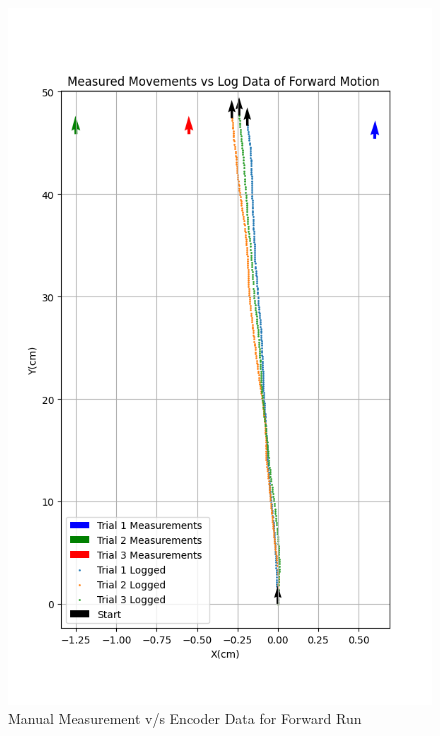 {        \begin{figure}[!ht] 
            \centering \includegraphics[scale=.60]{"images/experiment_2/Figure_forward.png"}
            \caption{Manual Measurement v/s Encoder Data for Forward Run}
            \label{fig:forward-manual-encoder}
        \end{figure}
        
}
